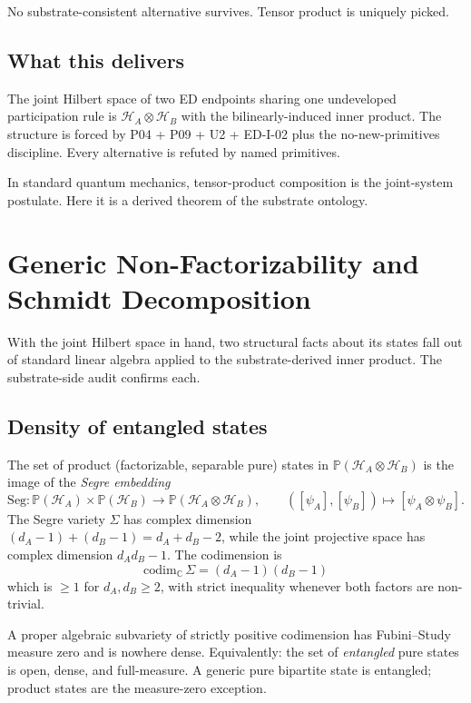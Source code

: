 \documentclass[11pt,a4paper]{article}
\begin{document}
No substrate-consistent alternative survives. Tensor product is uniquely picked.

\subsection{What this delivers}

The joint Hilbert space of two ED endpoints sharing one undeveloped participation rule is $\mathcal{H}_A \otimes \mathcal{H}_B$ with the bilinearly-induced inner product. The structure is forced by P04 + P09 + U2 + ED-I-02 plus the no-new-primitives discipline. Every alternative is refuted by named primitives.

In standard quantum mechanics, tensor-product composition is the joint-system postulate. Here it is a derived theorem of the substrate ontology.

\section{Generic Non-Factorizability and Schmidt Decomposition}

With the joint Hilbert space in hand, two structural facts about its states fall out of standard linear algebra applied to the substrate-derived inner product. The substrate-side audit confirms each.

\subsection{Density of entangled states}

The set of product (factorizable, separable pure) states in $\mathbb{P}(\mathcal{H}_A \otimes \mathcal{H}_B)$ is the image of the \emph{Segre embedding}
\[
\mathrm{Seg}: \mathbb{P}(\mathcal{H}_A) \times \mathbb{P}(\mathcal{H}_B) \to \mathbb{P}(\mathcal{H}_A \otimes \mathcal{H}_B), \qquad ([\psi_A], [\psi_B]) \mapsto [\psi_A \otimes \psi_B].
\]
The Segre variety $\Sigma$ has complex dimension $(d_A - 1) + (d_B - 1) = d_A + d_B - 2$, while the joint projective space has complex dimension $d_A d_B - 1$. The codimension is
\[
\mathrm{codim}_\mathbb{C}\, \Sigma = (d_A - 1)(d_B - 1)
\]
which is $\geq 1$ for $d_A, d_B \geq 2$, with strict inequality whenever both factors are non-trivial.

A proper algebraic subvariety of strictly positive codimension has Fubini--Study measure zero and is nowhere dense. Equivalently: the set of \emph{entangled} pure states is open, dense, and full-measure. A generic pure bipartite state is entangled; product states are the measure-zero exception.
\end{document}
